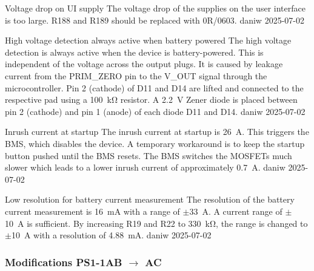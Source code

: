 \begin{ModTable}
\ModItemDone
{Voltage drop on UI supply}
{The voltage drop of the supplies on the user interface is too large. }
{R188 and R189 should be replaced with 0R/0603. }
{daniw}
{2025-07-02}

\ModItemDone
{High voltage detection always active when battery powered}
{The high voltage detection is always active when the device is battery-powered. This is independent of the voltage across the output plugs. It is caused by leakage current from the PRIM\_ZERO pin to the V\_OUT signal through the microcontroller. }
{Pin 2 (cathode) of D11 and D14 are lifted and connected to the respective pad using a \qty{100}{\kilo\ohm} resistor. A \qty{2.2}{\volt} Zener diode is placed between pin 2 (cathode) and pin 1 (anode) of each diode D11 and D14. }
{daniw}
{2025-07-02}

\ModItemDone
{Inrush current at startup}
{The inrush current at startup is \qty{26}{\ampere}. This triggers the \ac{BMS}, which disables the device. }
{A temporary workaround is to keep the startup button pushed until the \ac{BMS} resets. The \ac{BMS} switches the \acp{MOSFET} much slower which leads to a lower inrush current of approximately \qty{0.7}{\ampere}. }
{daniw}
{2025-07-02}

\ModItemDone
{Low resolution for battery current measurement}
{The resolution of the battery current measurement is \qty{16}{\milli\ampere} with a range of $\pm$\qty{33}{\ampere}. A current range of $\pm$\qty{10}{\ampere} is sufficient. }
{By increasing R19 and R22 to \qty{330}{\kilo\ohm}, the range is changed to $\pm$\qty{10}{\ampere} with a resolution of \qty{4.88}{\milli\ampere}. }
{daniw}
{2025-07-02}

\end{ModTable}

\FloatBarrier

\subsubsection{Modifications PS1-1AB $\to$ AC}

